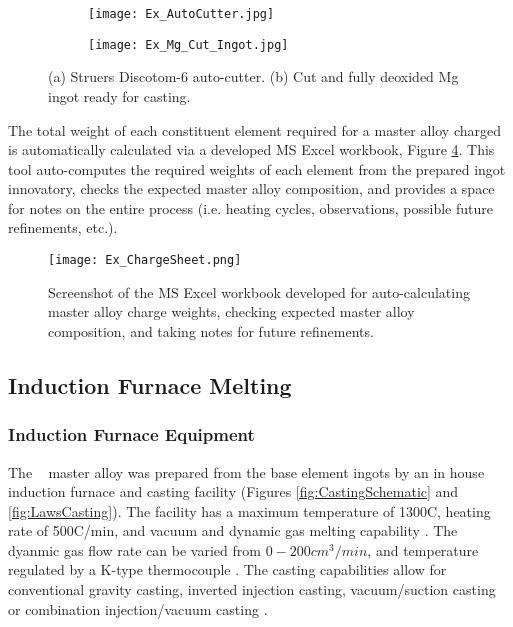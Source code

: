 \documentclass[a4paper,12pt,oneside]{report}%
\begin{document}
\begin{figure}[htbp]
	\centering
	\begin{subfigure}[htbp]{0.49\textwidth}
		\texttt{[image: Ex\_AutoCutter.jpg]}
		\caption{}
		\label{fig:AutoCutter}
	\end{subfigure}
	\begin{subfigure}[htbp]{0.30\textwidth}
		\texttt{[image: Ex\_Mg\_Cut\_Ingot.jpg]}
		\caption{}
		\label{fig:MgIngot}
	\end{subfigure}
	\caption{(a) Struers Discotom-6 auto-cutter. (b) Cut and fully deoxided Mg ingot ready for casting.}%
	\label{fig:Cutter_MgIngot}
\end{figure}

The total weight of each constituent element required for a master alloy charged is automatically calculated via a developed MS Excel workbook, Figure \ref{fig:ChargeSheet}. This tool auto-computes the required weights of each element from the prepared ingot innovatory, checks the expected master alloy composition, and provides a space for notes on the entire process (i.e. heating cycles, observations, possible future refinements, etc.).

\begin{figure}[htbp]
	\centering
	\texttt{[image: Ex\_ChargeSheet.png]}
	\caption{Screenshot of the MS Excel workbook developed for auto-calculating master alloy charge weights, checking expected master alloy composition, and taking notes for future refinements.}
	\label{fig:ChargeSheet}
\end{figure}

\subsection{Induction Furnace Melting}
\subsubsection{Induction Furnace Equipment}
The \MgZnCa~ master alloy was prepared from the base element ingots by an in house induction furnace and casting facility (Figures \ref{fig:CastingSchematic} and \ref{fig:LawsCasting}). The facility has a maximum temperature of 1300\degree C, heating rate of 500\degree C/min, and vacuum and dynamic gas melting capability \cite{Laws2007}. The dyanmic gas flow rate can be varied from $0-200 cm^{3}/min$, and temperature regulated by a K-type thermocouple \cite{Laws2007}. The casting capabilities allow for conventional gravity casting, inverted injection casting, vacuum/suction casting or combination injection/vacuum casting \cite{Laws2007}.
\end{document}
